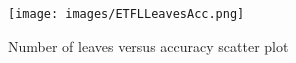 \documentclass[a4paper]{report}
\begin{document}
	\begin{figure}
		\centering
			\texttt{[image: images/ETFLLeavesAcc.png]}
		\caption{\label{fig:ETFLLeavesAcc}Number of leaves versus accuracy scatter plot}
	\end{figure}
	
\end{document}
